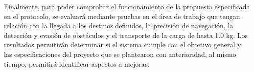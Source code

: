 Finalmente, para poder comprobar el funcionamiento de la propuesta especificada en el protocolo, se evaluará mediante pruebas en el área de trabajo que tengan relación con la llegada a los destinos definidos, la precisión de navegación, la detección y evasión de obstáculos y el transporte de la carga de hasta 1.0 kg. Los resultados permitirán determinar si el sistema cumple con el objetivo general y las especificaciones del proyecto que se plantearon con anterioridad, al mismo tiempo, permitirá identificar aspectos a mejorar.